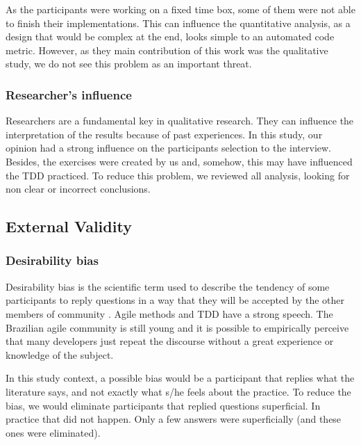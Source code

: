 \documentclass[times]{elsarticle}
\begin{document}
As the participants were working on a fixed time box, some of them were not able to finish 
their implementations. This can influence the
quantitative analysis, as a design that would be complex at the end, looks simple
to an automated code metric. However, as they main contribution of this work was
the qualitative study, we do not see this problem as an important threat.

\subsubsection{Researcher's influence}

Researchers are a fundamental key in qualitative research. They can influence
the interpretation of the results because of past experiences.
In this study, our opinion had a strong influence on the participants selection
to the interview.
Besides, the exercises were created by us and, somehow, this may have influenced
the TDD practiced. To reduce this problem, we reviewed all analysis, looking for
non clear or incorrect conclusions.


\subsection{External Validity}

\subsubsection{Desirability bias}

Desirability bias is the scientific term used to describe the tendency of some participants
to reply questions in a way that they will be accepted by the other members
of community \cite{crowne}.
Agile methods and TDD have a strong speech. The Brazilian agile community is still
young and it is possible to empirically perceive that many developers just
repeat the discourse without a great experience or knowledge of the subject.

In this study context, a possible bias would be a participant that replies
what the literature says, and not exactly what s/he feels about the practice.
To reduce the bias, we would eliminate participants that replied questions superficial.
In practice that did not happen. Only a few answers were superficially (and these
ones were eliminated).
\end{document}
